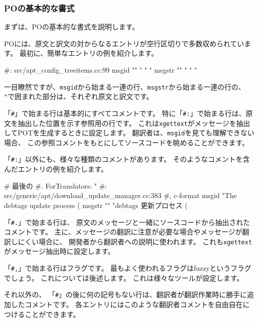 \documentclass[mingoth,a4paper]{jsarticle}
\begin{document}
\subsubsection{POの基本的な書式}

まずは、POの基本的な書式を説明します。

POには、原文と訳文の対からなるエントリが空行区切りで多数収められています。
最初に、簡単なエントリの例を紹介します。

\begin{commandline}
#: src/apt_config_treeitems.cc:99
msgid ""
"%
"%
"%
msgstr ""
"%
"%
"%
\end{commandline}

一目瞭然ですが、\texttt{msgid}から始まる一連の行、\texttt{msgstr}から始まる一連の行の、
\verb!"!で囲まれた部分は、それぞれ原文と訳文です。

「\texttt{\#}」で始まる行は基本的にすべてコメントです。
特に「\texttt{\#:}」で始まる行は、原文を抽出した位置を示す参照用の行です。
これは\texttt{xgettext}がメッセージを抽出してPOTを生成するときに設定します。
翻訳者は、\texttt{msgid}を見ても理解できない場合、
この参照コメントをもとにしてソースコードを眺めることができます。

「\texttt{\#:}」以外にも、様々な種類のコメントがあります。
そのようなコメントを含んだエントリの例を紹介します。

\begin{commandline}
# 最後の %
#. ForTranslators: "%
#: src/generic/apt/download_update_manager.cc:383
#, c-format
msgid "The debtags update process (%
msgstr ""
"debtags 更新プロセス (%
\end{commandline}

「\texttt{\#.}」で始まる行は、
原文のメッセージと一緒にソースコードから抽出されたコメントです。
主に、メッセージの翻訳に注意が必要な場合やメッセージが翻訳しにくい場合に、
開発者から翻訳者への説明に使われます。
これも\texttt{xgettext}がメッセージ抽出時に設定します。

「\texttt{\#,}」で始まる行はフラグです。
最もよく使われるフラグはfuzzyというフラグでしょう。
これについては後述します。
これは様々なツールが設定します。

それ以外の、
「\texttt{\#}」の後に何の記号もない行は、翻訳者が翻訳作業時に勝手に追加したコメントです。
各エントリにはこのような翻訳者コメントを自由自在につけることができます。
\end{document}
